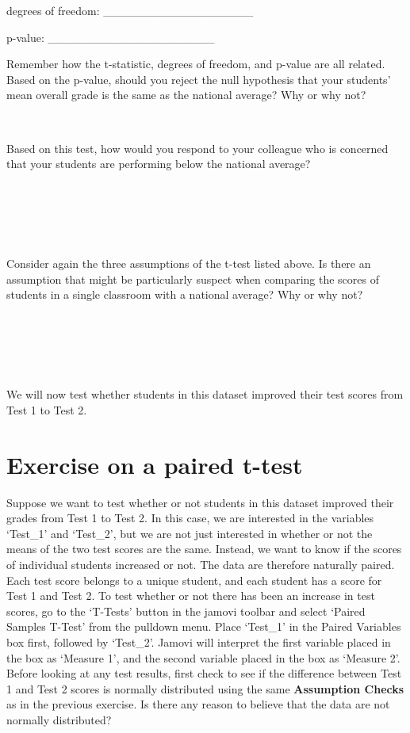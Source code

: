\documentclass[
]{scrbook}
\begin{document}
degrees of freedom: \_\_\_\_\_\_\_\_\_\_\_\_\_\_\_\_\_\_

p-value: \_\_\_\_\_\_\_\_\_\_\_\_\_\_\_\_\_\_\_\_

Remember how the t-statistic, degrees of freedom, and p-value are all related.
Based on the p-value, should you reject the null hypothesis that your students' mean overall grade is the same as the national average?
Why or why not?

\begin{verbatim}


\end{verbatim}

Based on this test, how would you respond to your colleague who is concerned that your students are performing below the national average?

\begin{verbatim}





\end{verbatim}

Consider again the three assumptions of the t-test listed above.
Is there an assumption that might be particularly suspect when comparing the scores of students in a single classroom with a national average?
Why or why not?

\begin{verbatim}





\end{verbatim}

We will now test whether students in this dataset improved their test scores from Test 1 to Test 2.

\hypertarget{exercise-on-a-paired-t-test}{%
\section{Exercise on a paired t-test}\label{exercise-on-a-paired-t-test}}

Suppose we want to test whether or not students in this dataset improved their grades from Test 1 to Test 2.
In this case, we are interested in the variables `Test\_1' and `Test\_2', but we are not just interested in whether or not the means of the two test scores are the same.
Instead, we want to know if the scores of individual students increased or not.
The data are therefore naturally paired.
Each test score belongs to a unique student, and each student has a score for Test 1 and Test 2.
To test whether or not there has been an increase in test scores, go to the `T-Tests' button in the jamovi toolbar and select `Paired Samples T-Test' from the pulldown menu.
Place `Test\_1' in the Paired Variables box first, followed by `Test\_2'.
Jamovi will interpret the first variable placed in the box as `Measure 1', and the second variable placed in the box as `Measure 2'.
Before looking at any test results, first check to see if the difference between Test 1 and Test 2 scores is normally distributed using the same \textbf{Assumption Checks} as in the previous exercise.
Is there any reason to believe that the data are not normally distributed?
\end{document}
